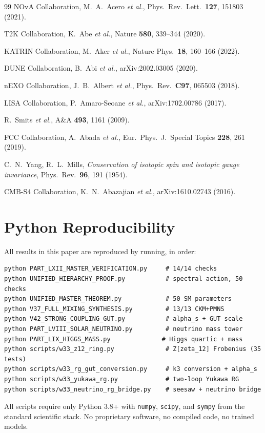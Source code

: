 \documentclass[12pt,a4paper]{article}
\begin{document}
\begin{thebibliography}{99}
 NOvA Collaboration, M.~A.~Acero \textit{et al.},
  Phys.~Rev.~Lett.\ \textbf{127}, 151803 (2021).

 T2K Collaboration, K.~Abe \textit{et al.},
  Nature \textbf{580}, 339--344 (2020).

 KATRIN Collaboration, M.~Aker \textit{et al.},
  Nature Phys.\ \textbf{18}, 160--166 (2022).

 DUNE Collaboration, B.~Abi \textit{et al.},
  arXiv:2002.03005 (2020).

 nEXO Collaboration, J.~B.~Albert \textit{et al.},
  Phys.~Rev.\ \textbf{C97}, 065503 (2018).

 LISA Collaboration, P.~Amaro-Seoane \textit{et al.},
  arXiv:1702.00786 (2017).

 R.~Smits \textit{et al.},
  A\&A \textbf{493}, 1161 (2009).

 FCC Collaboration, A.~Abada \textit{et al.},
  Eur.~Phys.~J.~Special Topics \textbf{228}, 261 (2019).

 C.~N.~Yang, R.~L.~Mills,
  \textit{Conservation of isotopic spin and isotopic gauge invariance},
  Phys.~Rev.\ \textbf{96}, 191 (1954).

 CMB-S4 Collaboration, K.~N.~Abazajian \textit{et al.},
  arXiv:1610.02743 (2016).

\end{thebibliography}

\appendix

\section{Python Reproducibility}
\label{app:code}

All results in this paper are reproduced by running, in order:
\begin{verbatim}
python PART_LXII_MASTER_VERIFICATION.py     # 14/14 checks
python UNIFIED_HIERARCHY_PROOF.py           # spectral action, 50 checks
python UNIFIED_MASTER_THEOREM.py            # 50 SM parameters
python V37_FULL_MIXING_SYNTHESIS.py         # 13/13 CKM+PMNS
python V42_STRONG_COUPLING_GUT.py           # alpha_s + GUT scale
python PART_LVIII_SOLAR_NEUTRINO.py         # neutrino mass tower
python PART_LIX_HIGGS_MASS.py              # Higgs quartic + mass
python scripts/w33_z12_ring.py              # Z[zeta_12] Frobenius (35 tests)
python scripts/w33_rg_gut_conversion.py     # k3 conversion + alpha_s
python scripts/w33_yukawa_rg.py             # two-loop Yukawa RG
python scripts/w33_neutrino_rg_bridge.py    # seesaw + neutrino bridge
\end{verbatim}
All scripts require only Python 3.8+ with \texttt{numpy}, \texttt{scipy},
and \texttt{sympy} from the standard scientific stack.
No proprietary software, no compiled code, no trained models.
\end{document}
